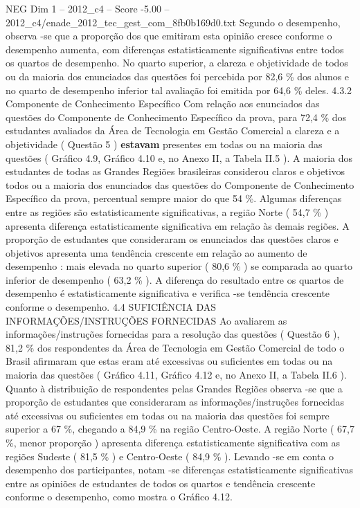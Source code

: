 \begin{textsample}{NEG Dim 1 – 2012\_c4 – Score -5.00 – 2012\_c4/enade\_2012\_tec\_gest\_com\_8fb0b169d0.txt}
Segundo o desempenho, observa -se que a proporção dos que emitiram esta opinião cresce conforme o desempenho aumenta, com diferenças estatisticamente significativas entre todos os quartos de desempenho.
No quarto superior, a clareza e objetividade de todos ou da maioria dos enunciados das questões foi percebida por 82,6 \% dos alunos e no quarto de desempenho inferior tal avaliação foi emitida por 64,6 \% deles. 4.3.2 Componente de Conhecimento Específico Com relação aos enunciados das questões do Componente de Conhecimento Específico da prova, para 72,4 \% dos estudantes avaliados da Área de Tecnologia em Gestão Comercial a clareza e a objetividade ( Questão 5 ) \textbf{estavam} presentes em todas ou na maioria das questões ( Gráfico 4.9, Gráfico 4.10 e, no Anexo II, a Tabela II.5 ).
A maioria dos estudantes de todas as Grandes Regiões brasileiras considerou claros e objetivos todos ou a maioria dos enunciados das questões do Componente de Conhecimento Específico da prova, percentual sempre maior do que 54 \%.
Algumas diferenças entre as regiões são estatisticamente significativas, a região Norte ( 54,7 \% ) apresenta diferença estatisticamente significativa em relação às demais regiões.
A proporção de estudantes que consideraram os enunciados das questões claros e objetivos apresenta uma tendência crescente em relação ao aumento de desempenho : mais elevada no quarto superior ( 80,6 \% ) se comparada ao quarto inferior de desempenho ( 63,2 \% ).
A diferença do resultado entre os quartos de desempenho é estatisticamente significativa e verifica -se tendência crescente conforme o desempenho. 4.4 SUFICIÊNCIA DAS INFORMAÇÕES/INSTRUÇÕES FORNECIDAS Ao avaliarem as informações/instruções fornecidas para a resolução das questões ( Questão 6 ), 81,2 \% dos respondentes da Área de Tecnologia em Gestão Comercial de todo o Brasil afirmaram que estas eram até excessivas ou suficientes em todas ou na maioria das questões ( Gráfico 4.11, Gráfico 4.12 e, no Anexo II, a Tabela II.6 ).
Quanto à distribuição de respondentes pelas Grandes Regiões observa -se que a proporção de estudantes que consideraram as informações/instruções fornecidas até excessivas ou suficientes em todas ou na maioria das questões foi sempre superior a 67 \%, chegando a 84,9 \% na região Centro-Oeste.
A região Norte ( 67,7 \%, menor proporção ) apresenta diferença estatisticamente significativa com as regiões Sudeste ( 81,5 \% ) e Centro-Oeste ( 84,9 \% ).
Levando -se em conta o desempenho dos participantes, notam -se diferenças estatisticamente significativas entre as opiniões de estudantes de todos os quartos e tendência crescente conforme o desempenho, como mostra o Gráfico 4.12.

\end{textsample}

